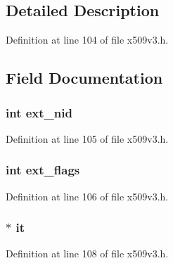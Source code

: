 \subsection{Detailed Description}


Definition at line 104 of file x509v3.\+h.



\subsection{Field Documentation}
\subsubsection[{\texorpdfstring{ext\+\_\+nid}{ext_nid}}]{\setlength{\rightskip}{0pt plus 5cm}int ext\+\_\+nid}\hypertarget{structv3__ext__method_a10dc0a0467f26c140f1b5427b38492d1}{}\label{structv3__ext__method_a10dc0a0467f26c140f1b5427b38492d1}


Definition at line 105 of file x509v3.\+h.

\subsubsection[{\texorpdfstring{ext\+\_\+flags}{ext_flags}}]{\setlength{\rightskip}{0pt plus 5cm}int ext\+\_\+flags}\hypertarget{structv3__ext__method_a5bf9f7724cd5e6696724498df385a8c5}{}\label{structv3__ext__method_a5bf9f7724cd5e6696724498df385a8c5}


Definition at line 106 of file x509v3.\+h.

\subsubsection[{\texorpdfstring{it}{it}}]{ $\ast$ it}\hypertarget{structv3__ext__method_a7d3924c7537c0bce00c3984eed44795a}{}\label{structv3__ext__method_a7d3924c7537c0bce00c3984eed44795a}


Definition at line 108 of file x509v3.\+h.

